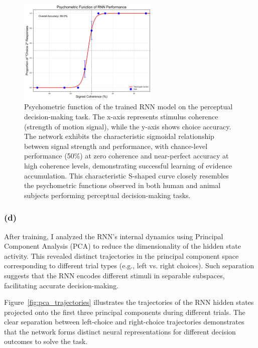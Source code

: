 \documentclass[11pt]{article}
\begin{document}
\begin{figure}[h]
\centering
\includegraphics[width=0.6\textwidth]{psychometric_function.png}
\caption{Psychometric function of the trained RNN model on the perceptual decision-making task. The x-axis represents stimulus coherence (strength of motion signal), while the y-axis shows choice accuracy. The network exhibits the characteristic sigmoidal relationship between signal strength and performance, with chance-level performance (50\%) at zero coherence and near-perfect accuracy at high coherence levels, demonstrating successful learning of evidence accumulation. This characteristic S-shaped curve closely resembles the psychometric functions observed in both human and animal subjects performing perceptual decision-making tasks.}
\label{fig:psychometric_function}
\end{figure}

\pagebreak


\subsubsection*{(d)}

After training, I analyzed the RNN's internal dynamics using Principal Component Analysis (PCA) to reduce the dimensionality of the hidden state activity. This revealed distinct trajectories in the principal component space corresponding to different trial types (e.g., left vs. right choices). Such separation suggests that the RNN encodes different stimuli in separable subspaces, facilitating accurate decision-making.

Figure~\ref{fig:pca_trajectories} illustrates the trajectories of the RNN hidden states projected onto the first three principal components during different trials. The clear separation between left-choice and right-choice trajectories demonstrates that the network forms distinct neural representations for different decision outcomes to solve the task. 
\end{document}
